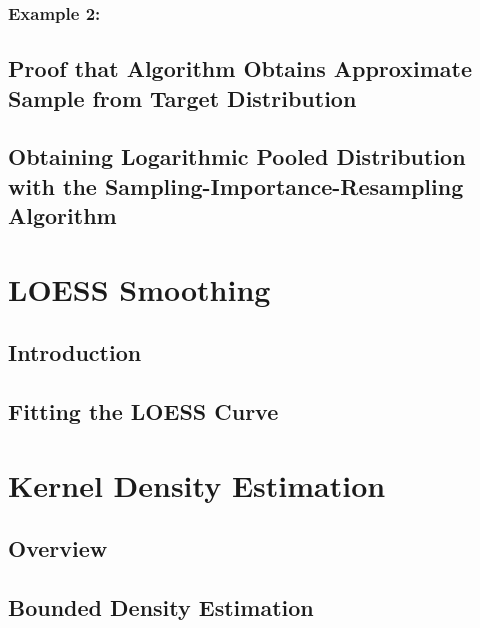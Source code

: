 \documentclass[12pt,twoside]{smiththesis}
\begin{document}
\hypertarget{example-2}{%
\subsubsection{Example 2:}\label{example-2}}

\hypertarget{proof}{%
\subsection{Proof that Algorithm Obtains Approximate Sample from Target Distribution}\label{proof}}

\hypertarget{logpooled}{%
\subsection{Obtaining Logarithmic Pooled Distribution with the Sampling-Importance-Resampling Algorithm}\label{logpooled}}

\hypertarget{loess-smoothing}{%
\section{LOESS Smoothing}\label{loess-smoothing}}

\hypertarget{introduction}{%
\subsection{Introduction}\label{introduction}}

\hypertarget{fitting-the-loess-curve}{%
\subsection{Fitting the LOESS Curve}\label{fitting-the-loess-curve}}

\hypertarget{kernel-density-estimation}{%
\section{Kernel Density Estimation}\label{kernel-density-estimation}}

\hypertarget{overview-1}{%
\subsection{Overview}\label{overview-1}}

\hypertarget{bounded-density-estimation}{%
\subsection{Bounded Density Estimation}\label{bounded-density-estimation}}
\end{document}
